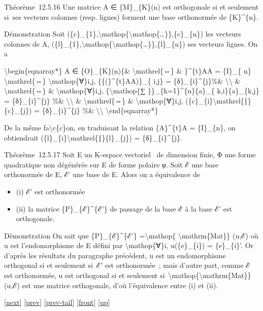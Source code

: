 \documentclass[]{article}
\begin{document}
Théorème~12.5.16 Une matrice A ∈ \{M\}\_\{K\}(n) est orthogonale si et
seulement si~ses vecteurs colonnes (resp. lignes) forment une base
orthonormée de \{K\}\^{}\{n\}.

Démonstration Soit
(\{c\}\_\{1\},\textbackslash{}mathop\{\textbackslash{}mathop\{\ldots{}\}\},\{c\}\_\{n\})
les vecteurs colonnes de A,
(\{l\}\_\{1\},\textbackslash{}mathop\{\textbackslash{}mathop\{\ldots{}\}\},\{l\}\_\{n\})
ses vecteurs lignes. On a

\textbackslash{}begin\{eqnarray*\} A ∈ \{O\}\_\{K\}(n)\{\&
\textbackslash{}mathrel\{⇔\} \& \}\^{}\{t\}AA = \{I\}\_\{ n\}
\textbackslash{}mathrel\{⇔\} \textbackslash{}mathop\{∀\}i,j,
\{\{(\}\^{}\{t\}AA)\}\_\{ i,j\} = \{δ\}\_\{i\}\^{}\{j\}\%\&
\textbackslash{}\textbackslash{} \& \textbackslash{}mathrel\{⇔\} \&
\textbackslash{}mathop\{∀\}i,j, \{\textbackslash{}mathop\{∑
\}\}\_\{k=1\}\^{}\{n\}\{a\}\_\{ k,i\}\{a\}\_\{k,j\} =
\{δ\}\_\{i\}\^{}\{j\} \%\& \textbackslash{}\textbackslash{} \&
\textbackslash{}mathrel\{⇔\} \& \textbackslash{}mathop\{∀\}i,j,
(\{c\}\_\{i\}\textbackslash{}mathrel\{∣\}\{c\}\_\{j\}) =
\{δ\}\_\{i\}\^{}\{j\} \%\& \textbackslash{}\textbackslash{}
\textbackslash{}end\{eqnarray*\}

De la même fa\textbackslash{}c\{c\}on, en traduisant la relation
\{A\}\^{}\{t\}A = \{I\}\_\{n\}, on obtiendrait
(\{l\}\_\{i\}\textbackslash{}mathrel\{∣\}\{l\}\_\{j\}) =
\{δ\}\_\{i\}\^{}\{j\}.

Théorème~12.5.17 Soit E un K-espace vectoriel ~de dimension finie, Φ une
forme quadratique non dégénérée sur E de forme polaire φ. Soit ℰ une
base orthonormée de E, ℰ' une base de E. Alors on a équivalence de

\begin{itemize}
\itemsep1pt\parskip0pt
\item
  (i) ℰ' est orthonormée
\item
  (ii) la matrice \{P\}\_\{ℰ\}\^{}\{ℰ'\} de passage de la base ℰ à la
  base ℰ' est orthogonale.
\end{itemize}

Démonstration On sait que \{P\}\_\{ℰ\}\^{}\{ℰ'\}
=\textbackslash{}mathop\{ \textbackslash{}mathrm\{Mat\}\} (u,ℰ) où u est
l'endomorphisme de E défini par \textbackslash{}mathop\{∀\}i,
u(\{e\}\_\{i\}) = \{e\}\_\{i\}'. Or d'après les résultats du paragraphe
précédent, u est un endomorphisme orthogonal si et seulement si~ℰ' est
orthonormée~; mais d'autre part, comme ℰ est orthonormée, u est
orthogonal si et seulement
si~\textbackslash{}mathop\{\textbackslash{}mathrm\{Mat\}\} (u,ℰ) est une
matrice orthogonale, d'où l'équivalence entre (i) et (ii).

{[}\href{coursse72.html}{next}{]} {[}\href{coursse70.html}{prev}{]}
{[}\href{coursse70.html\#tailcoursse70.html}{prev-tail}{]}
{[}\href{coursse71.html}{front}{]}
{[}\href{coursch13.html\#coursse71.html}{up}{]}
\end{document}
